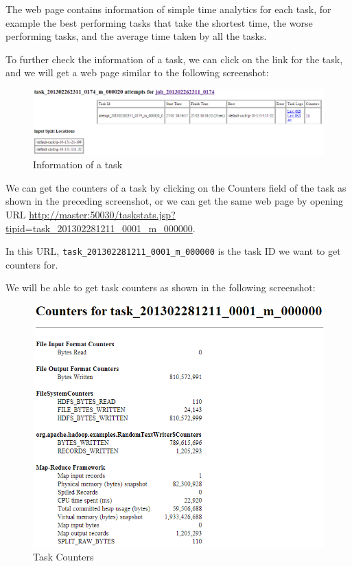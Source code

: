 The web page contains information of simple time analytics for each task, for example the best performing tasks that take the shortest time, the worse performing tasks, and the average time taken by all the tasks.

To further check the information of a task, we can click on the link for the task, and we will get a web page similar to the following screenshot:
\begin{figure}[h]
  \centering
  \includegraphics[width=.7\textwidth]{figs/5163os_04_04.png}
  \caption{Information of a task}\label{fig:task.info}
\end{figure} 

We can get the counters of a task by clicking on the Counters field of the task as shown in the preceding screenshot, or we can get the same web page by opening URL \url{http://master:50030/taskstats.jsp?tipid=task_201302281211_0001_m_000000}.

In this URL, \verb|task_201302281211_0001_m_000000| is the task ID we want to get counters for.

We will be able to get task counters as shown in the following screenshot: 
\begin{figure}[h]
  \centering
  \includegraphics[width=.8\textwidth]{figs/5163os_04_05.png}
  \caption{Task Counters}\label{fig:task.counters}
\end{figure} 

